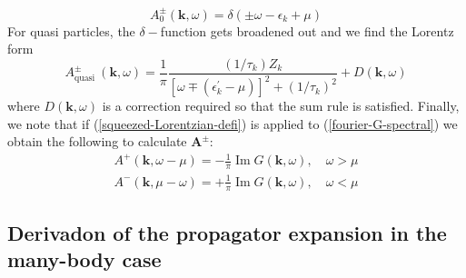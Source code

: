 \begin{equation}A_{0}^{\pm}(\mathbf{k}, \omega)=\delta\left(\pm \omega-\epsilon_{k}+\mu\right)\end{equation}
For quasi particles, the $\delta-$function gets broadened out and we find the Lorentz form
\begin{equation}A_{\text {quasi }}^{\pm}(\mathbf{k}, \omega)=\frac{1}{\pi} \frac{\left(1 / \tau_{k}\right) Z_{k}}{\left[\omega \mp\left(\epsilon_{k}^{\prime}-\mu\right)\right]^{2}+\left(1 / \tau_{k}\right)^{2}}+D(\mathbf{k}, \omega)\end{equation}
where $D(\mathbf{k},\omega)$ is a correction required so that the sum rule is satisfied. Finally, we note that if (\ref{squeezed-Lorentzian-defi}) is applied to (\ref{fourier-G-spectral}) we obtain the following to calculate $\mathbf{A}^{\pm}$:
\begin{equation}\begin{array}{l}
A^{+}(\mathbf{k}, \omega-\mu)=-\frac{1}{\pi} \operatorname{Im} G(\mathbf{k}, \omega), \quad \omega>\mu \\
A^{-}(\mathbf{k}, \mu-\omega)=+\frac{1}{\pi} \operatorname{Im} G(\mathbf{k}, \omega), \quad \omega<\mu
\end{array}\end{equation}

\subsection{Derivadon of the propagator expansion in the many-body case}